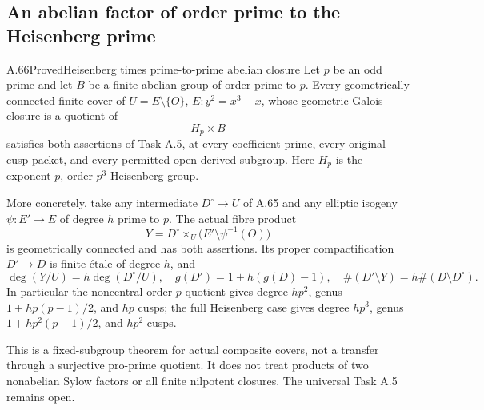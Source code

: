 \subsection{An abelian factor of order prime to the Heisenberg prime}

\begin{statement}{A.66}{Proved}{Heisenberg times prime-to-prime abelian closure}
Let \(p\) be an odd prime and let \(B\) be a finite abelian group
of order prime to \(p\). Every geometrically connected finite
cover of \(U=E\setminus\{O\}\), \(E:y^2=x^3-x\), whose geometric
Galois closure is a quotient of
\[
                         H_p\times B
\]
satisfies both assertions of Task A.5, at every coefficient
prime, every original cusp packet, and every permitted open
derived subgroup. Here \(H_p\) is the exponent-\(p\), order-\(p^3\)
Heisenberg group.

More concretely, take any intermediate \(D^\circ\to U\) of
A.65 and any elliptic isogeny \(\psi:E'\to E\) of degree \(h\)
prime to \(p\). The actual fibre product
\[
 Y=D^\circ\times_U
       \bigl(E'\setminus\psi^{-1}(O)\bigr)
                                                               \tag{A.66.1}
\]
is geometrically connected and has both assertions. Its proper
compactification \(D'\to D\) is finite étale of degree \(h\), and
\[
 \deg(Y/U)=h\deg(D^\circ/U),\quad
 g(D')=1+h(g(D)-1),\quad
 \#(D'\setminus Y)=h\#(D\setminus D^\circ).
                                                               \tag{A.66.2}
\]
In particular the noncentral order-\(p\) quotient gives degree
\(hp^2\), genus \(1+hp(p-1)/2\), and \(hp\) cusps; the full
Heisenberg case gives degree \(hp^3\), genus
\(1+hp^2(p-1)/2\), and \(hp^2\) cusps.

This is a fixed-subgroup theorem for actual composite covers,
not a transfer through a surjective pro-prime quotient. It does
not treat products of two nonabelian Sylow factors or all finite
nilpotent closures. The universal Task A.5 remains open.
\end{statement}

